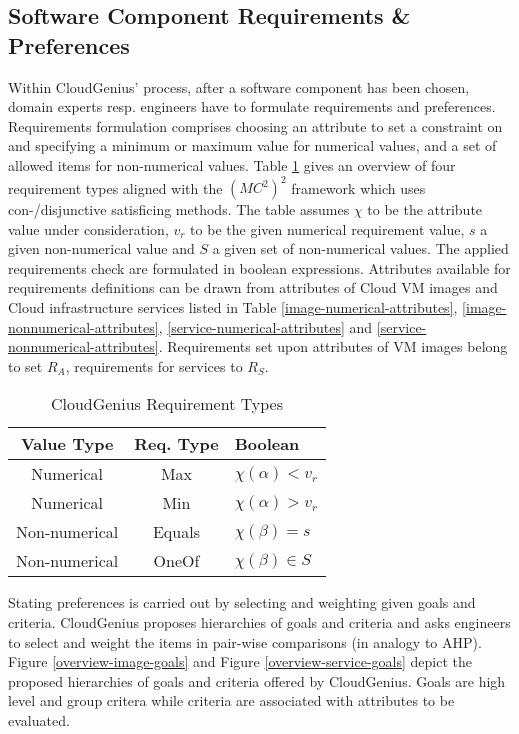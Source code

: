 \documentclass[10pt]{article}
\begin{document}
\subsection{Software Component Requirements \& Preferences}\label{sec-reqs-prefs}

Within CloudGenius' process, after a software component has been chosen, domain experts resp. engineers have to formulate requirements and preferences. Requirements formulation comprises choosing an attribute to set a constraint on and specifying a minimum or maximum value for numerical values, and a set of allowed items for non-numerical values. Table \ref{requirement-types} gives an overview of four requirement types aligned with the $(MC^2)^2$ framework which uses con-/disjunctive satisficing methods. The table assumes $\chi$ to be the attribute value under consideration, $v_r$ to be the given numerical requirement value, $s$ a given non-numerical value and $S$ a given set of non-numerical values. The applied requirements check are formulated in boolean expressions.
Attributes available for requirements definitions can be drawn from attributes of Cloud VM images and Cloud infrastructure services listed in Table \ref{image-numerical-attributes}, \ref{image-nonnumerical-attributes}, \ref{service-numerical-attributes} and \ref{service-nonnumerical-attributes}. Requirements set upon attributes of VM images belong to set $R_A$, requirements for services to $R_S$.

\begin{table}
\centering
\caption{CloudGenius Requirement Types}\label{requirement-types}
\begin{tabular}{|c|c|l|} \hline
Value Type&Req. Type&Boolean\\ \hline
Numerical&Max&$\chi(\alpha) < v_r$\\
Numerical&Min&$\chi(\alpha) > v_r$\\
Non-numerical&Equals&$\chi(\beta) = s$\\
Non-numerical&OneOf&$\chi(\beta) \in S$\\
\hline\end{tabular}
\end{table}


Stating preferences is carried out by selecting and weighting given goals and criteria. CloudGenius proposes hierarchies of goals and criteria and asks engineers to select and weight the items in pair-wise comparisons (in analogy to AHP). Figure \ref{overview-image-goals} and Figure \ref{overview-service-goals} depict the proposed hierarchies of goals and criteria offered by CloudGenius. Goals are high level and group critera while criteria are associated with attributes to be evaluated.  
\end{document}
